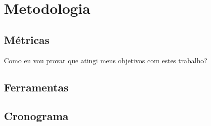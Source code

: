 \chapter{Metodologia}

\section{Métricas}
Como eu vou provar que atingi meus objetivos com estes trabalho?

\section{Ferramentas}

\section{Cronograma}
